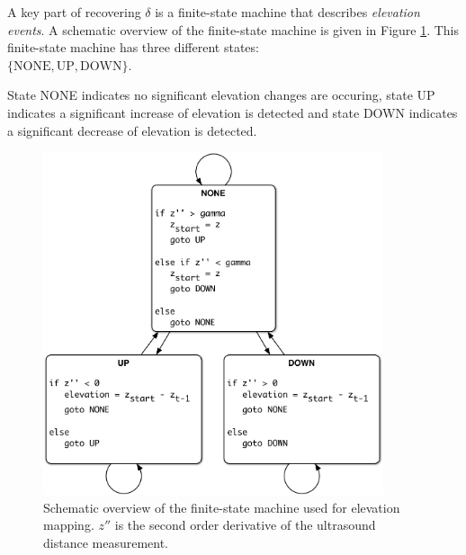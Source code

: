 A key part of recovering $\delta$ is a finite-state machine that describes \textit{elevation events}.
A schematic overview of the finite-state machine is given in Figure \ref{fig:elevation_map_fsm}.
This finite-state machine has three different states: \\ $\{ \text{NONE}, \text{UP}, \text{DOWN} \}$.

State NONE indicates no significant elevation changes are occuring, state UP indicates a significant increase of elevation is detected and state DOWN indicates a significant decrease of elevation is detected.

\begin{figure}[htb]
\centering
\includegraphics[width=10cm]{images/elevation_map_fsm.pdf}
\caption{Schematic overview of the finite-state machine used for elevation mapping. $z''$ is the second order derivative of the ultrasound distance measurement.}
\label{fig:elevation_map_fsm}
\end{figure}

